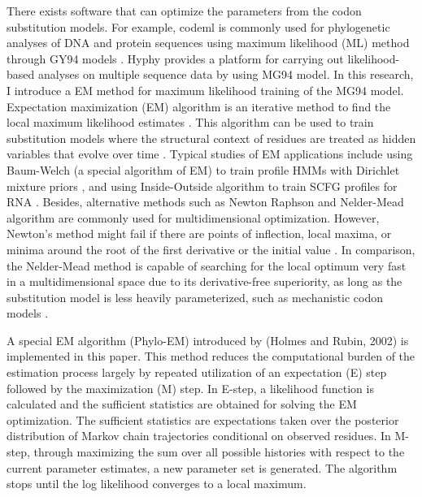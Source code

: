 There exists software that can optimize the parameters from the codon substitution models. For example, codeml is commonly used for phylogenetic analyses of DNA and protein sequences using maximum likelihood (ML) method through GY94 models \parencite{yang2007paml}. Hyphy provides a platform for carrying out likelihood-based analyses on multiple sequence data by using MG94 model. In this research, I introduce a EM method for maximum likelihood training of the MG94 model. Expectation maximization (EM) algorithm is an iterative method to find the local maximum likelihood estimates \parencite{dempster1977maximum}. This algorithm can be used to train substitution models where the structural context of residues are treated as hidden variables that evolve over time \parencite{holmes2002expectation}. Typical studies of EM applications include using Baum-Welch (a special algorithm of EM) to train profile HMMs with Dirichlet mixture priors \parencite{brown1993using}, and using Inside-Outside algorithm to train SCFG profiles for RNA \parencite{durbin1998biological}. Besides, alternative methods such as Newton Raphson and Nelder-Mead algorithm are commonly used for multidimensional optimization. However, Newton's method might fail if there are points of inflection, local maxima, or minima around the root of the first derivative or the initial value \parencite{more1982newton}. In comparison, the Nelder-Mead method is capable of searching for the local optimum very fast in a multidimensional space due to its derivative-free superiority, as long as the substitution model is less heavily parameterized, such as mechanistic codon models \parencite{yu1979convergente}.  

A special EM algorithm (Phylo-EM) introduced by (Holmes and Rubin, 2002) is implemented in this paper. This method reduces the computational burden of the estimation process largely by repeated utilization of an expectation (E) step followed by the maximization (M) step. In E-step, a likelihood function is calculated and the sufficient statistics are obtained for solving the EM optimization. The sufficient statistics are expectations taken over the posterior distribution of Markov chain trajectories conditional on observed residues. In M-step, through maximizing the sum over all possible histories with respect to the current parameter estimates, a new parameter set is generated. The algorithm stops until the log likelihood converges to a local maximum.   

